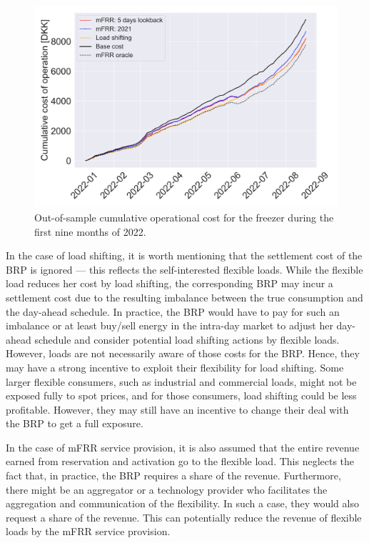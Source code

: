 \begin{figure}[t]
    \centering
    \includegraphics[width=\columnwidth]{../figures/cumulative_cost_comparison.png}
    \caption{Out-of-sample cumulative operational cost for the freezer during the first nine months of 2022.}
    \label{fig:cumulative_cost_comparison}
    \vspace{-2mm}
\end{figure}

In the case of load shifting, it is worth mentioning that the settlement cost of the BRP is ignored --- this reflects the self-interested flexible loads.  While the flexible load reduces her cost by load shifting, the corresponding BRP may incur a settlement cost due to the resulting imbalance between the true consumption and the day-ahead schedule. In practice, the BRP would have to pay for such an imbalance or at least buy/sell energy in the intra-day market to adjust her day-ahead schedule and consider potential load shifting actions by flexible loads. However, loads are not necessarily aware of those costs for the BRP. Hence, they may have a strong incentive to exploit their flexibility for load shifting. Some larger flexible consumers, such as industrial and commercial loads, might not be exposed fully to spot prices, and for those consumers, load shifting could be less profitable. However, they may still have an incentive to change their deal with the BRP to get a full exposure.

In the case of mFRR service provision, it is also  assumed that the entire revenue earned from reservation and activation go to the flexible load. This neglects the fact that, in practice, the BRP requires a share of the revenue. Furthermore, there might be an aggregator or a technology provider who facilitates the aggregation and communication of the flexibility. In such a case, they would also request a share of the revenue. This can potentially reduce the revenue of flexible loads by the mFRR service provision.








